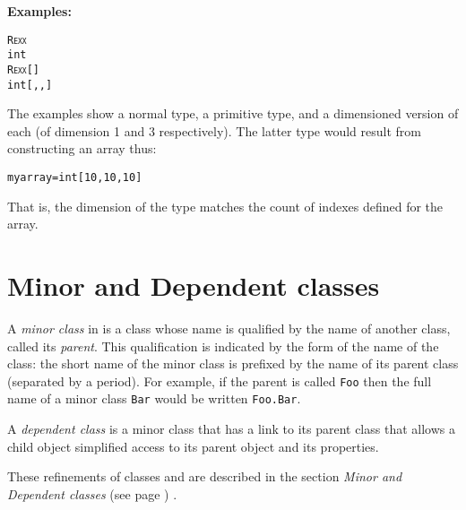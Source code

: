 \textbf{Examples:}
\begin{alltt}
R\textsc{exx}
int
R\textsc{exx}[]
int[,,]
\end{alltt}

The examples show a normal type, a primitive type, and a dimensioned
version of each (of dimension 1 and 3 respectively).  The latter type
would result from constructing an array thus:
\begin{alltt}
myarray=int[10,10,10]
\end{alltt}
That is, the dimension of the type matches the count of indexes
defined for the array.
\section{Minor and Dependent classes}\label{refmindep}
 
A \emph{minor class} in \nr{} is a class whose name is qualified by
the name of another class, called its \emph{parent}.
This qualification is indicated by the form of the name of the class:
the short name of the minor class is prefixed by the name of its parent
class (separated by a period).
For example, if the parent is called \texttt{Foo} then the full name of a
minor class \texttt{Bar} would be written \texttt{Foo.Bar}.
 
A \emph{dependent class} is a minor class that has a link to its
parent class that allows a child object simplified access to its
parent object and its properties.
 
These refinements of classes and are described in the
section  \emph{Minor and Dependent classes} (see page \pageref{refminor}) .
